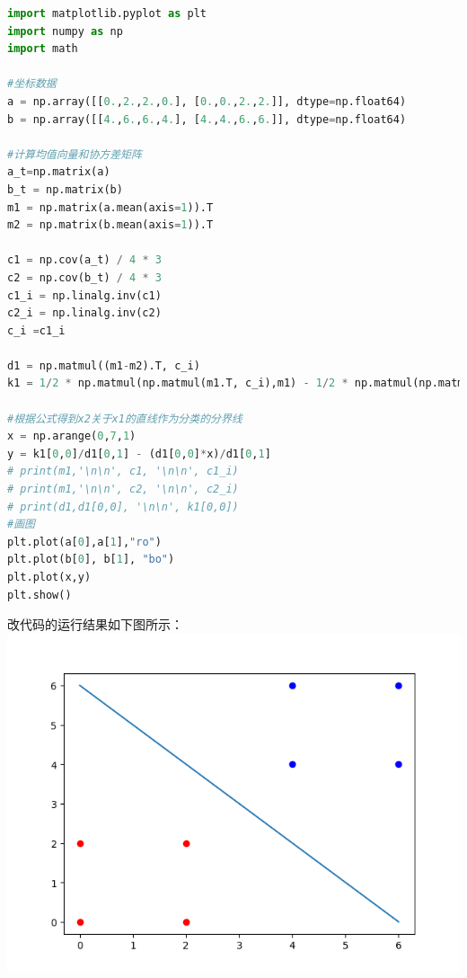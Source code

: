 \documentclass[UTF8, 12pt, a4paper, fleqn]{ctexart}
\begin{document}
    \begin{lstlisting}[language={Python}] 
import matplotlib.pyplot as plt
import numpy as np
import math

#坐标数据
a = np.array([[0.,2.,2.,0.], [0.,0.,2.,2.]], dtype=np.float64)
b = np.array([[4.,6.,6.,4.], [4.,4.,6.,6.]], dtype=np.float64)

#计算均值向量和协方差矩阵
a_t=np.matrix(a)
b_t = np.matrix(b)
m1 = np.matrix(a.mean(axis=1)).T
m2 = np.matrix(b.mean(axis=1)).T

c1 = np.cov(a_t) / 4 * 3
c2 = np.cov(b_t) / 4 * 3
c1_i = np.linalg.inv(c1)
c2_i = np.linalg.inv(c2)
c_i =c1_i

d1 = np.matmul((m1-m2).T, c_i)
k1 = 1/2 * np.matmul(np.matmul(m1.T, c_i),m1) - 1/2 * np.matmul(np.matmul(m2.T, c_i), m2)

#根据公式得到x2关于x1的直线作为分类的分界线
x = np.arange(0,7,1)
y = k1[0,0]/d1[0,1] - (d1[0,0]*x)/d1[0,1]
# print(m1,'\n\n', c1, '\n\n', c1_i)
# print(m1,'\n\n', c2, '\n\n', c2_i)
# print(d1,d1[0,0], '\n\n', k1[0,0])
#画图
plt.plot(a[0],a[1],"ro")
plt.plot(b[0], b[1], "bo")
plt.plot(x,y)
plt.show()
    \end{lstlisting}
    改代码的运行结果如下图所示：\\
    \includegraphics[]{Figure_1.png}
\end{document}
